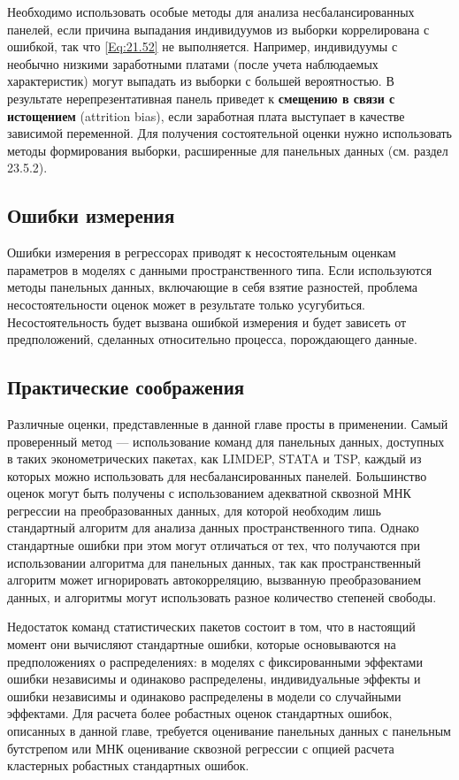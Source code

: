 Необходимо использовать особые методы для анализа несбалансированных панелей, если причина выпадания индивидуумов из выборки коррелирована с ошибкой, так что \ref{Eq:21.52} не выполняется. Например, индивидуумы с необычно низкими заработными платами (после учета наблюдаемых характеристик) могут выпадать из выборки с большей вероятностью. В результате нерепрезентативная панель приведет к \textbf{смещению в связи с истощением} (attrition bias), если заработная плата выступает в качестве зависимой переменной. Для получения состоятельной оценки нужно использовать методы формирования выборки, расширенные для панельных данных (см. раздел 23.5.2).

\subsection{Ошибки измерения}

Ошибки измерения в регрессорах приводят к несостоятельным оценкам параметров в моделях с данными пространственного типа. Если используются методы панельных данных, включающие в себя взятие разностей, проблема несостоятельности оценок может в результате только усугубиться.  Несостоятельность будет  вызвана ошибкой измерения и будет зависеть от предположений, сделанных относительно процесса, порождающего данные.

\subsection{Практические соображения}

Различные оценки, представленные в данной главе просты в применении. Самый проверенный метод --- использование команд для панельных данных, доступных в таких эконометрических пакетах, как LIMDEP, STATA и TSP, каждый из которых можно использовать для  несбалансированных панелей. Большинство оценок могут быть получены с использованием адекватной сквозной МНК регрессии на преобразованных данных, для которой необходим лишь стандартный алгоритм для анализа данных пространственного типа. Однако стандартные ошибки при этом могут отличаться от тех, что получаются при использовании алгоритма для панельных данных, так как пространственный алгоритм может игнорировать автокорреляцию, вызванную преобразованием данных, и алгоритмы могут использовать разное количество степеней свободы.

Недостаток команд статистических пакетов состоит в том, что в настоящий момент они вычисляют стандартные ошибки, которые основываются на  предположениях о распределениях: в моделях с фиксированными эффектами ошибки независимы и одинаково распределены,  индивидуальные эффекты и ошибки независимы и одинаково распределены в модели со случайными эффектами. Для расчета более робастных оценок стандартных ошибок, описанных в данной главе, требуется оценивание панельных данных с панельным бутстрепом или МНК оценивание сквозной регрессии с опцией расчета кластерных робастных стандартных ошибок.

